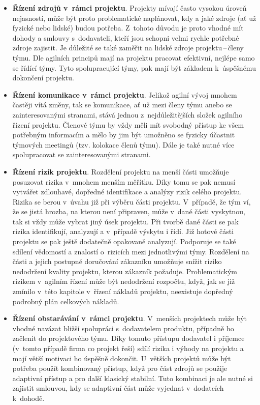 \begin{itemize}
    \item \textbf{Řízení zdrojů v~rámci projektu}. Projekty mívají často vysokou úroveň nejasností, může být proto problematické naplánovat, kdy a jaké zdroje (ať už fyzické nebo lidské) budou potřeba. Z~tohoto důvodu je proto vhodné mít dohody a smlouvy s~dodavateli, kteří jsou schopni velmi rychle potřebné zdroje zajistit. Je důležité se také zaměřit na lidské zdroje projektu\,--\,členy týmu. Dle agilních principů mají na projektu pracovat efektivní, nejlépe samo se řídící týmy. Tyto spolupracující týmy, pak mají být základem k~úspěšnému dokončení projektu.
    \item \textbf{Řízení komunikace v~rámci projektu}. Jelikož agilní vývoj mnohem častěji vítá změny, tak se komunikace, ať už mezi členy týmu anebo se zainteresovanými stranami, stává jednou z~nejdůležitějších složek agilního řízení projektu. Členové týmu by vždy měli mít svobodný přístup ke všem potřebným informacím a mělo by jim být umožněno se fyzicky účastnit týmových meetingů (tzv. kolokace členů týmu). Dále je také nutné více spolupracovat se zainteresovanými stranami.  
    \item \textbf{Řízení rizik projektu}. Rozdělení projektu na menší části umožňuje posuzovat rizika v~mnohem menším měřítku. Díky tomu se pak nemusí vytvářet zdlouhavé, dopředné identifikace a analýzy rizik celého projektu. Rizika se berou v~úvahu již při výběru části projektu. V~případě, že tým ví, že se jistá hrozba, na kterou není připraven, může v~dané části vyskytnou, tak si vždy může vybrat jiný úsek projektu. Při tvorbě dané části se pak rizika identifikují, analyzují a v~případě výskytu i řídí. Již hotové části projektu se pak ještě dodatečně opakovaně analyzují. Podporuje se také sdílení vědomostí a znalostí o~rizicích mezi jednotlivými týmy. Rozdělení na části a jejich postupné doručování zákazníku umožňuje snížit riziko nedodržení kvality projektu, kterou zákazník požaduje. Problematickým rizikem v~agilním řízení může být nedodržení rozpočtu, když, jak se již zmínilo v~této kapitole v~řízení nákladů projektu, neexistuje dopředný podrobný plán celkových nákladů.
    \item \textbf{Řízení obstarávání v~rámci projektu}. V~menších projektech může být vhodné navázat bližší spolupráci s~dodavatelem produktu, případně ho začlenit do projektového týmu. Díky tomuto přístupu dodavatel i příjemce (v~tomto případě firma co projekt řeší) sdílí rizika i výhody na projektu a mají větší motivaci ho úspěšně dokončit. U~větších projektů může být potřeba použít kombinovaný přístup, když pro část zdrojů se použije adaptivní přístup a pro další klasický stabilní. Tuto kombinaci je ale nutné si zajistit smlouvou, kdy se adaptivní část může vyjednat v~dodatcích k~dohodě.

\end{itemize}
